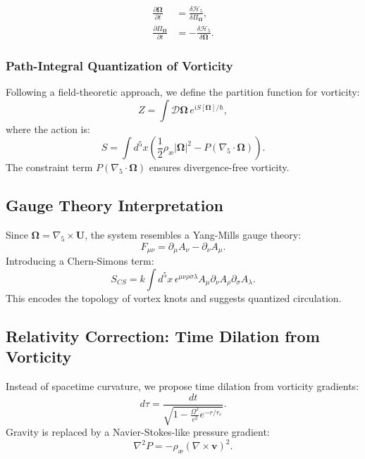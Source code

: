 \begin{align}
    \frac{\partial \boldsymbol{\Omega}}{\partial t} &= \frac{\delta \mathcal{H}_5}{\delta \Pi_{\boldsymbol{\Omega}}}, \\
    \frac{\partial \Pi_{\boldsymbol{\Omega}}}{\partial t} &= -\frac{\delta \mathcal{H}_5}{\delta \boldsymbol{\Omega}}.
\end{align}

\subsubsection{Path-Integral Quantization of Vorticity}
Following a field-theoretic approach, we define the partition function for vorticity:
\begin{equation}
Z = \int \mathcal{D} \boldsymbol{\Omega} \, e^{i S[\boldsymbol{\Omega}] / \hbar},
\end{equation}
where the action is:
\begin{equation}
S = \int d^5x \left( \frac{1}{2} \rho_{\text{æ}} |\boldsymbol{\Omega}|^2 - P (\nabla_5 \cdot \boldsymbol{\Omega}) \right).
\end{equation}
The constraint term $P (\nabla_5 \cdot \boldsymbol{\Omega})$ ensures divergence-free vorticity.

\subsection{Gauge Theory Interpretation}
Since $\boldsymbol{\Omega} = \nabla_5 \times \mathbf{U}$, the system resembles a Yang-Mills gauge theory:
\begin{equation}
F_{\mu\nu} = \partial_\mu A_\nu - \partial_\nu A_\mu.
\end{equation}
Introducing a Chern-Simons term:
\begin{equation}
S_{CS} = k \int d^5x \, \epsilon^{\mu\nu\rho\sigma\lambda} A_\mu \partial_\nu A_\rho \partial_\sigma A_\lambda.
\end{equation}
This encodes the topology of vortex knots and suggests quantized circulation.

\subsection{Relativity Correction: Time Dilation from Vorticity}
Instead of spacetime curvature, we propose time dilation from vorticity gradients:
\begin{equation}
d\tau = \frac{dt}{\sqrt{1 - \frac{\Omega^2}{c^2} e^{-r/r_c}}}.
\end{equation}
Gravity is replaced by a Navier-Stokes-like pressure gradient:
\begin{equation}
\nabla^2 P = -\rho_{\text{æ}} (\nabla \times \mathbf{v})^2.
\end{equation}

